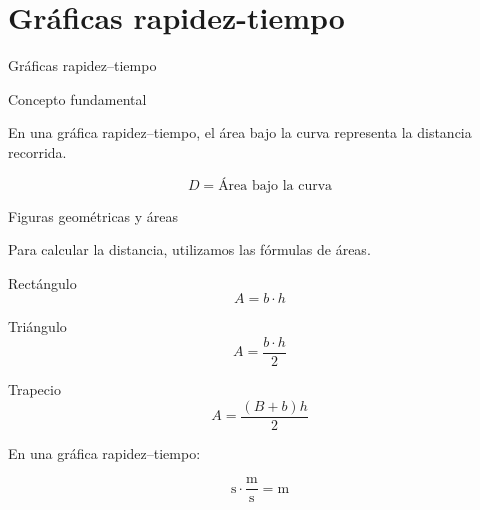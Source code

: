 \documentclass[aspectratio=169,10pt]{beamer}
\begin{document}
\section{Gráficas rapidez-tiempo}

\begin{frame}{Gráficas rapidez--tiempo}

\begin{block}{Concepto fundamental}

En una gráfica rapidez--tiempo,
el área bajo la curva representa
la distancia recorrida.

\[
\boxed{D=\text{Área bajo la curva}}
\]

\end{block}

\begin{center}
\end{center}

\end{frame}

\begin{frame}{Figuras geométricas y áreas}

Para calcular la distancia,
utilizamos las fórmulas de áreas.

\begin{block}{Rectángulo}
\[
A=b\cdot h
\]
\end{block}

\begin{block}{Triángulo}
\[
A=\frac{b\cdot h}{2}
\]
\end{block}

\begin{block}{Trapecio}
\[
A=\frac{(B+b)h}{2}
\]
\end{block}

En una gráfica rapidez--tiempo:

\[
\mathrm{s}\cdot\frac{\mathrm{m}}{\mathrm{s}}
=\mathrm{m}
\]

\end{frame}
\end{document}
